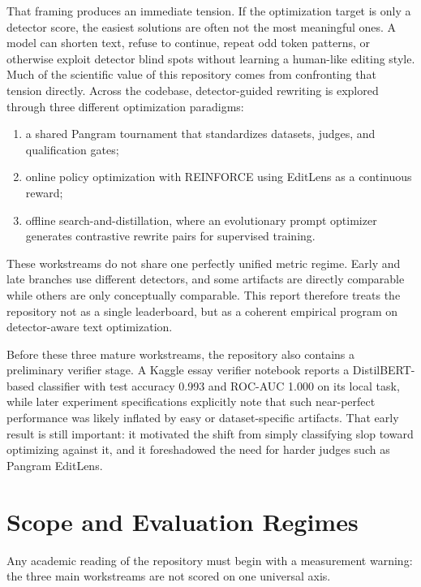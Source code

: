 \documentclass[11pt]{article}
\begin{document}
That framing produces an immediate tension. If the optimization target is only a detector score, the easiest solutions are often not the most meaningful ones. A model can shorten text, refuse to continue, repeat odd token patterns, or otherwise exploit detector blind spots without learning a human-like editing style. Much of the scientific value of this repository comes from confronting that tension directly. Across the codebase, detector-guided rewriting is explored through three different optimization paradigms:

\begin{enumerate}[leftmargin=1.3em]
\item a shared Pangram tournament that standardizes datasets, judges, and qualification gates;
\item online policy optimization with REINFORCE using EditLens as a continuous reward;
\item offline search-and-distillation, where an evolutionary prompt optimizer generates contrastive rewrite pairs for supervised training.
\end{enumerate}

These workstreams do not share one perfectly unified metric regime. Early and late branches use different detectors, and some artifacts are directly comparable while others are only conceptually comparable. This report therefore treats the repository not as a single leaderboard, but as a coherent empirical program on detector-aware text optimization.

Before these three mature workstreams, the repository also contains a preliminary verifier stage. A Kaggle essay verifier notebook reports a DistilBERT-based classifier with test accuracy 0.993 and ROC-AUC 1.000 on its local task, while later experiment specifications explicitly note that such near-perfect performance was likely inflated by easy or dataset-specific artifacts. That early result is still important: it motivated the shift from simply classifying slop toward optimizing against it, and it foreshadowed the need for harder judges such as Pangram EditLens.

\section{Scope and Evaluation Regimes}

Any academic reading of the repository must begin with a measurement warning: the three main workstreams are not scored on one universal axis.
\end{document}
